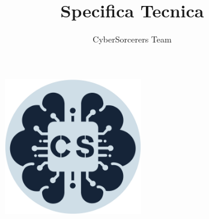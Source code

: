 \documentclass{article}
\title{\Huge{\textbf{Specifica Tecnica}}\vspace{-1em}}
\author{CyberSorcerers Team}
\date{}
\begin{document}
\maketitle
\vspace{-3em}
\begin{figure}[h]
  \centering
  \includegraphics[width=6cm, height=6cm]{documenti/logo rotondo.png}
  \label{fig:immagine}
\end{figure}
\end{document}
